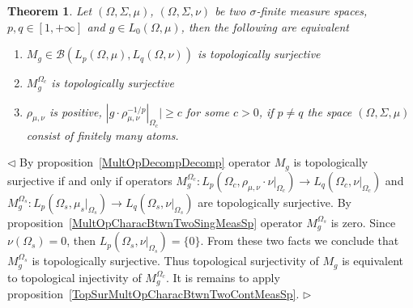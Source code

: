 \documentclass[12pt]{article}
\newtheorem{theorem}{Theorem}[subsection]
\newenvironment{proof}{\par $\triangleleft$}{$\triangleright$}
\begin{document}
\begin{theorem}\label{TopSurMultOpCharacBtwnTwoMeasSp} Let
    $(\Omega,\Sigma,\mu)$, $(\Omega,\Sigma,\nu)$ be two $\sigma$-finite measure
    spaces, $p,q\in[1,+\infty]$ and $g\in L_0(\Omega,\mu)$, then the following
    are equivalent
    \begin{enumerate}[label = (\roman*)]
        \item $M_g\in\mathcal{B}(L_p(\Omega,\mu), L_q(\Omega,\nu))$ is
              topologically surjective

        \item $M_g^{\Omega_c}$ is topologically surjective

        \item $\rho_{\mu,\nu}$ is positive,
              $|g\cdot\rho_{\mu,\nu}^{-1/p}|_{\Omega_c}|\geq c$ for some
              $c>0$, if $p\neq q$ the space $(\Omega,\Sigma,\mu)$ consist
              of finitely many atoms.
    \end{enumerate}
\end{theorem}
\begin{proof}
    By proposition~\ref{MultOpDecompDecomp} operator $M_g$ is topologically
    surjective if and only if operators
    $M_g^{\Omega_c}:L_p(\Omega_c,\rho_{\mu,\nu}\cdot\nu|_{\Omega_c})\to
        L_q(\Omega_c,\nu|_{\Omega_c})$ and $M_g^{\Omega_s}:
        L_p(\Omega_s,\mu_s|_{\Omega_s})\to L_q(\Omega_s,\nu|_{\Omega_s})$ are
    topologically surjective. By proposition~\ref{MultOpCharacBtwnTwoSingMeasSp}
    operator $M_g^{\Omega_s}$ is zero. Since $\nu(\Omega_s)=0$, then
    $L_p(\Omega_s,\nu|_{\Omega_s})= \{0 \}$. From these two facts we conclude
    that $M_g^{\Omega_s}$ is topologically surjective. Thus topological
    surjectivity of $M_g$ is equivalent to topological injectivity of
    $M_g^{\Omega_c}$. It is remains to apply
    proposition~\ref{TopSurMultOpCharacBtwnTwoContMeasSp}.
\end{proof}
\end{document}
